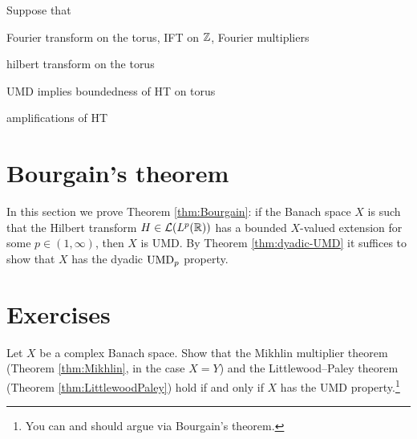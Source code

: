 \begin{thm}
  Suppose that 
\end{thm}

\begin{defn}
  Fourier transform on the torus, IFT on $\mathbb{Z}$, Fourier multipliers
\end{defn}

\begin{defn}
  hilbert transform on the torus
\end{defn}

\begin{thm}
  UMD implies boundedness of HT on torus
\end{thm}

\begin{defn}
  amplifications of HT 
\end{defn}

\section{Bourgain's theorem}

In this section we prove Theorem \ref{thm:Bourgain}: if the Banach space $X$ is such that the Hilbert transform $H \in \mathcal{L}(L^p(\mathbb{R}))$ has a bounded $X$-valued extension for some $p \in (1,\infty)$, then $X$ is UMD.
By Theorem \ref{thm:dyadic-UMD} it suffices to show that $X$ has the dyadic $\mathrm{UMD}_{p}$ property.


\section*{Exercises}

\begin{exercise}
  Let $X$ be a complex Banach space.
  Show that the Mikhlin multiplier theorem (Theorem \ref{thm:Mikhlin}, in the case $X = Y$) and the Littlewood--Paley theorem (Theorem \ref{thm:LittlewoodPaley}) hold if and only if $X$ has the UMD property.\footnote{You can and should argue via Bourgain's theorem.}
\end{exercise}




